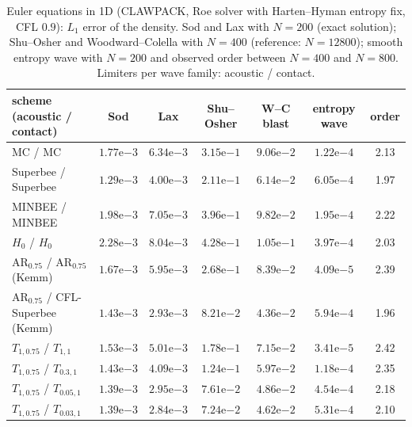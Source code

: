 \begin{table}[t]\centering\footnotesize\setlength{\tabcolsep}{3.5pt}
\caption{Euler equations in 1D (CLAWPACK, Roe solver with Harten--Hyman entropy fix, CFL $0.9$): $L_1$ error of the density. Sod and Lax with $N=200$ (exact solution); Shu--Osher and Woodward--Colella with $N=400$ (reference: $N=12800$); smooth entropy wave with $N=200$ and observed order between $N=400$ and $N=800$. Limiters per wave family: acoustic / contact.}\label{tab:euler1d}
\begin{tabular}{lcccccc}\toprule
scheme (acoustic / contact) & Sod & Lax & Shu--Osher & W--C blast & entropy wave & order \\ \midrule
MC / MC & $1.77\mathrm{e}{-3}$ & $6.34\mathrm{e}{-3}$ & $3.15\mathrm{e}{-1}$ & $9.06\mathrm{e}{-2}$ & $1.22\mathrm{e}{-4}$ & 2.13 \\
Superbee / Superbee & $1.29\mathrm{e}{-3}$ & $4.00\mathrm{e}{-3}$ & $2.11\mathrm{e}{-1}$ & $6.14\mathrm{e}{-2}$ & $6.05\mathrm{e}{-4}$ & 1.97 \\
MINBEE / MINBEE & $1.98\mathrm{e}{-3}$ & $7.05\mathrm{e}{-3}$ & $3.96\mathrm{e}{-1}$ & $9.82\mathrm{e}{-2}$ & $1.95\mathrm{e}{-4}$ & 2.22 \\
$H_0$ / $H_0$ & $2.28\mathrm{e}{-3}$ & $8.04\mathrm{e}{-3}$ & $4.28\mathrm{e}{-1}$ & $1.05\mathrm{e}{-1}$ & $3.97\mathrm{e}{-4}$ & 2.03 \\
AR$_{0.75}$ / AR$_{0.75}$ (Kemm) & $1.67\mathrm{e}{-3}$ & $5.95\mathrm{e}{-3}$ & $2.68\mathrm{e}{-1}$ & $8.39\mathrm{e}{-2}$ & $4.09\mathrm{e}{-5}$ & 2.39 \\
AR$_{0.75}$ / CFL-Superbee (Kemm) & $1.43\mathrm{e}{-3}$ & $2.93\mathrm{e}{-3}$ & $8.21\mathrm{e}{-2}$ & $4.36\mathrm{e}{-2}$ & $5.94\mathrm{e}{-4}$ & 1.96 \\
$T_{1,0.75}$ / $T_{1,1}$ & $1.53\mathrm{e}{-3}$ & $5.01\mathrm{e}{-3}$ & $1.78\mathrm{e}{-1}$ & $7.15\mathrm{e}{-2}$ & $3.41\mathrm{e}{-5}$ & 2.42 \\
$T_{1,0.75}$ / $T_{0.3,1}$ & $1.43\mathrm{e}{-3}$ & $4.09\mathrm{e}{-3}$ & $1.24\mathrm{e}{-1}$ & $5.97\mathrm{e}{-2}$ & $1.18\mathrm{e}{-4}$ & 2.35 \\
$T_{1,0.75}$ / $T_{0.05,1}$ & $1.39\mathrm{e}{-3}$ & $2.95\mathrm{e}{-3}$ & $7.61\mathrm{e}{-2}$ & $4.86\mathrm{e}{-2}$ & $4.54\mathrm{e}{-4}$ & 2.18 \\
$T_{1,0.75}$ / $T_{0.03,1}$ & $1.39\mathrm{e}{-3}$ & $2.84\mathrm{e}{-3}$ & $7.24\mathrm{e}{-2}$ & $4.62\mathrm{e}{-2}$ & $5.31\mathrm{e}{-4}$ & 2.10 \\
\bottomrule\end{tabular}\end{table}
